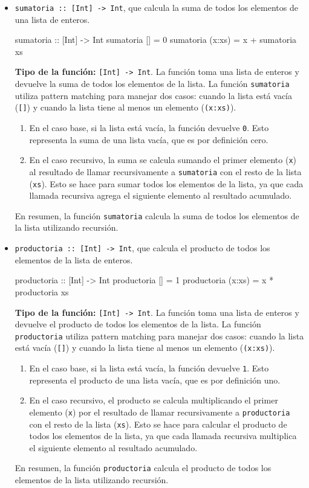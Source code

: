 \documentclass{article}
\begin{document}
\begin{itemize}
    \item 
\verb|sumatoria :: [Int] -> Int|, que calcula la suma de todos los elementos de una lista de enteros.
\begin{haskell}
sumatoria :: [Int] -> Int
sumatoria [] = 0
sumatoria (x:xs) = x + sumatoria xs
\end{haskell}
\textbf{Tipo de la función:} \verb|[Int] -> Int|. La función toma una lista de enteros y devuelve la suma de todos los elementos de la lista.
La función \verb|sumatoria| utiliza pattern matching para manejar dos casos: cuando la lista está vacía (\verb|[]|) y cuando la lista tiene al menos un elemento (\verb|(x:xs)|).
\begin{enumerate}
\item 
En el caso base, si la lista está vacía, la función devuelve \verb|0|. Esto representa la suma de una lista vacía, que es por definición cero.
\item 
En el caso recursivo, la suma se calcula sumando el primer elemento (\verb|x|) al resultado de llamar recursivamente a \verb|sumatoria| con el resto de la lista (\verb|xs|). Esto se hace para sumar todos los elementos de la lista, ya que cada llamada recursiva agrega el siguiente elemento al resultado acumulado.
\end{enumerate}
En resumen, la función \verb|sumatoria| calcula la suma de todos los elementos de la lista utilizando recursión.

    \item 
\verb|productoria :: [Int] -> Int|, que calcula el producto de todos los elementos de la lista de enteros.
\begin{haskell}
productoria :: [Int] -> Int
productoria [] = 1
productoria (x:xs) = x * productoria xs
\end{haskell}
\textbf{Tipo de la función:} \verb|[Int] -> Int|. La función toma una lista de enteros y devuelve el producto de todos los elementos de la lista.
La función \verb|productoria| utiliza pattern matching para manejar dos casos: cuando la lista está vacía (\verb|[]|) y cuando la lista tiene al menos un elemento (\verb|(x:xs)|).
\begin{enumerate}
\item 
En el caso base, si la lista está vacía, la función devuelve \verb|1|. Esto representa el producto de una lista vacía, que es por definición uno.
\item 
En el caso recursivo, el producto se calcula multiplicando el primer elemento (\verb|x|) por el resultado de llamar recursivamente a \verb|productoria| con el resto de la lista (\verb|xs|). Esto se hace para calcular el producto de todos los elementos de la lista, ya que cada llamada recursiva multiplica el siguiente elemento al resultado acumulado.
\end{enumerate}
En resumen, la función \verb|productoria| calcula el producto de todos los elementos de la lista utilizando recursión.


\end{itemize}
\end{document}
